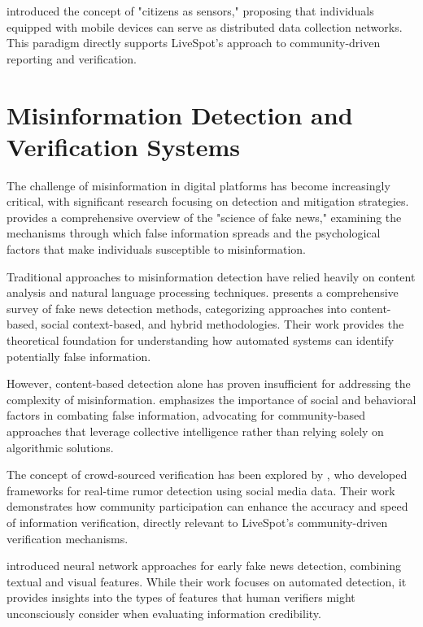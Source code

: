 \cite{goodchild2007citizens} introduced the concept of "citizens as sensors," proposing that individuals equipped with mobile devices can serve as distributed data collection networks. This paradigm directly supports LiveSpot's approach to community-driven reporting and verification.

\section{Misinformation Detection and Verification Systems}
\label{sec:misinformation_detection}

The challenge of misinformation in digital platforms has become increasingly critical, with significant research focusing on detection and mitigation strategies. \cite{lazer2018science} provides a comprehensive overview of the "science of fake news," examining the mechanisms through which false information spreads and the psychological factors that make individuals susceptible to misinformation.

Traditional approaches to misinformation detection have relied heavily on content analysis and natural language processing techniques. \cite{shu2017fake} presents a comprehensive survey of fake news detection methods, categorizing approaches into content-based, social context-based, and hybrid methodologies. Their work provides the theoretical foundation for understanding how automated systems can identify potentially false information.

However, content-based detection alone has proven insufficient for addressing the complexity of misinformation. \cite{pennycook2020fighting} emphasizes the importance of social and behavioral factors in combating false information, advocating for community-based approaches that leverage collective intelligence rather than relying solely on algorithmic solutions.

The concept of crowd-sourced verification has been explored by \cite{liu2015real}, who developed frameworks for real-time rumor detection using social media data. Their work demonstrates how community participation can enhance the accuracy and speed of information verification, directly relevant to LiveSpot's community-driven verification mechanisms.

\cite{wang2018eann} introduced neural network approaches for early fake news detection, combining textual and visual features. While their work focuses on automated detection, it provides insights into the types of features that human verifiers might unconsciously consider when evaluating information credibility.

